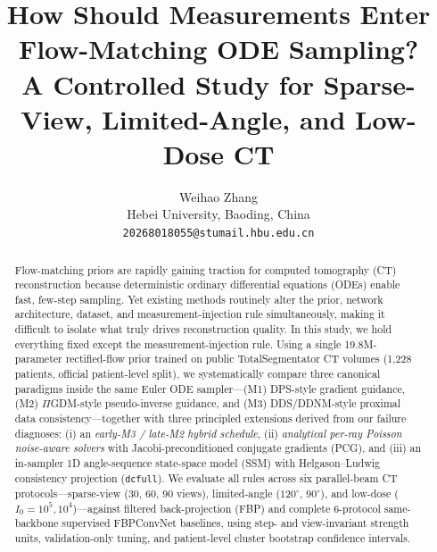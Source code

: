 \documentclass[11pt]{article}
\title{\textbf{How Should Measurements Enter Flow-Matching ODE Sampling?}\\
\large A Controlled Study for Sparse-View, Limited-Angle, and Low-Dose CT}
\author{Weihao Zhang\\
  Hebei University, Baoding, China\\
  \texttt{20268018055@stumail.hbu.edu.cn}}
\date{}
\begin{document}
\maketitle

\begin{abstract}
Flow-matching priors are rapidly gaining traction for computed tomography (CT) reconstruction because deterministic ordinary differential equations (ODEs) enable fast, few-step sampling. Yet existing methods routinely alter the prior, network architecture, dataset, and measurement-injection rule simultaneously, making it difficult to isolate what truly drives reconstruction quality. In this study, we hold everything fixed except the measurement-injection rule. Using a single 19.8M-parameter rectified-flow prior trained on public TotalSegmentator CT volumes (1{,}228 patients, official patient-level split), we systematically compare three canonical paradigms inside the same Euler ODE sampler---(M1) DPS-style gradient guidance, (M2) $\Pi$GDM-style pseudo-inverse guidance, and (M3) DDS/DDNM-style proximal data consistency---together with three principled extensions derived from our failure diagnoses: (i) an \emph{early-M3 / late-M2 hybrid schedule}, (ii) \emph{analytical per-ray Poisson noise-aware solvers} with Jacobi-preconditioned conjugate gradients (PCG), and (iii) an in-sampler 1D angle-sequence state-space model (SSM) with Helgason--Ludwig consistency projection (\texttt{dcfull}). We evaluate all rules across six parallel-beam CT protocols---sparse-view (30, 60, 90 views), limited-angle ($120^\circ$, $90^\circ$), and low-dose ($I_0{=}10^5, 10^4$)---against filtered back-projection (FBP) and complete 6-protocol same-backbone supervised FBPConvNet baselines, using step- and view-invariant strength units, validation-only tuning, and patient-level cluster bootstrap confidence intervals.


\end{abstract}
\end{document}
